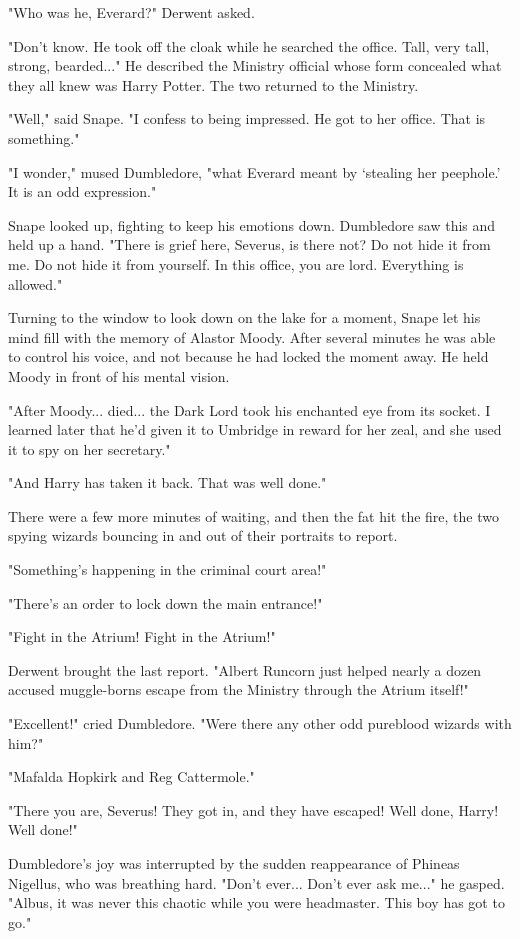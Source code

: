 \documentclass[a4paper,11pt]{article}
\begin{document}
"Who was he, Everard?" Derwent asked.

"Don't know. He took off the cloak while he searched the office. Tall, very tall, strong, bearded..." He described the Ministry official whose form concealed what they all knew was Harry Potter. The two returned to the Ministry.

"Well," said Snape. "I confess to being impressed. He got to her office. That is something."

"I wonder," mused Dumbledore, "what Everard meant by `stealing her peephole.' It is an odd expression."

Snape looked up, fighting to keep his emotions down. Dumbledore saw this and held up a hand. "There is grief here, Severus, is there not? Do not hide it from me. Do not hide it from yourself. In this office, you are lord. Everything is allowed."

Turning to the window to look down on the lake for a moment, Snape let his mind fill with the memory of Alastor Moody. After several minutes he was able to control his voice, and not because he had locked the moment away. He held Moody in front of his mental vision.

"After Moody... died... the Dark Lord took his enchanted eye from its socket. I learned later that he'd given it to Umbridge in reward for her zeal, and she used it to spy on her secretary."

"And Harry has taken it back. That was well done."

There were a few more minutes of waiting, and then the fat hit the fire, the two spying wizards bouncing in and out of their portraits to report.

"Something's happening in the criminal court area!"

"There's an order to lock down the main entrance!"

"Fight in the Atrium! Fight in the Atrium!"

Derwent brought the last report. "Albert Runcorn just helped nearly a dozen accused muggle-borns escape from the Ministry through the Atrium itself!"

"Excellent!" cried Dumbledore. "Were there any other odd pureblood wizards with him?"

"Mafalda Hopkirk and Reg Cattermole."

"There you are, Severus! They got in, and they have escaped! Well done, Harry! Well done!"

Dumbledore's joy was interrupted by the sudden reappearance of Phineas Nigellus, who was breathing hard. "Don't ever... Don't ever ask me..." he gasped. "Albus, it was never this chaotic while you were headmaster. This boy has got to go."
\end{document}

